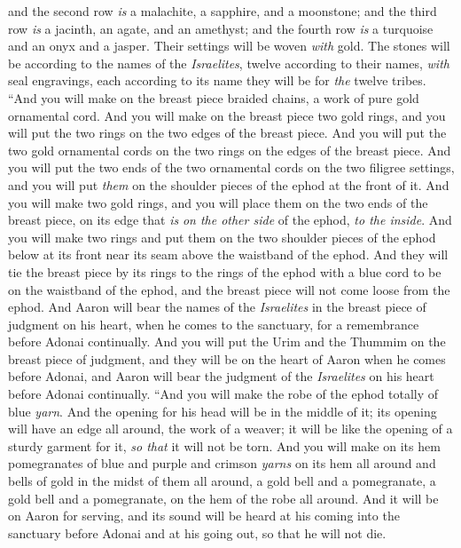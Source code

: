 \begin{biblechapter}
\verse and the second row \textit{is} a malachite, a sapphire, and a moonstone;
\verse and the third row \textit{is} a jacinth, an agate, and an amethyst;
\verse and the fourth row \textit{is} a turquoise and an onyx and a jasper. Their settings will be woven \textit{with} gold.
\verse The stones will be according to the names of the \textit{Israelites}, twelve according to their names, \textit{with} seal engravings, each according to its name they will be for \textit{the} twelve tribes.
\verse “And you will make on the breast piece braided chains, a work of pure gold ornamental cord.
\verse And you will make on the breast piece two gold rings, and you will put the two rings on the two edges of the breast piece.
\verse And you will put the two gold ornamental cords on the two rings on the edges of the breast piece.
\verse And you will put the two ends of the two ornamental cords on the two filigree settings, and you will put \textit{them} on the shoulder pieces of the ephod at the front of it.
\verse And you will make two gold rings, and you will place them on the two ends of the breast piece, on its edge that \textit{is} \textit{on the other side} of the ephod, \textit{to the inside}.
\verse And you will make two rings and put them on the two shoulder pieces of the ephod below at its front near its seam above the waistband of the ephod.
\verse And they will tie the breast piece by its rings to the rings of the ephod with a blue cord to be on the waistband of the ephod, and the breast piece will not come loose from the ephod.
\verse And Aaron will bear the names of the \textit{Israelites} in the breast piece of judgment on his heart, when he comes to the sanctuary, for a remembrance before Adonai continually.
\verse And you will put the Urim and the Thummim on the breast piece of judgment, and they will be on the heart of Aaron when he comes before Adonai, and Aaron will bear the judgment of the \textit{Israelites} on his heart before Adonai continually.
\verse “And you will make the robe of the ephod totally of blue \textit{yarn}.
\verse And the opening for his head will be in the middle of it; its opening will have an edge all around, the work of a weaver; it will be like the opening of a sturdy garment for it, \textit{so that} it will not be torn.
\verse And you will make on its hem pomegranates of blue and purple and crimson \textit{yarns} on its hem all around and bells of gold in the midst of them all around,
\verse a gold bell and a pomegranate, a gold bell and a pomegranate, on the hem of the robe all around.
\verse And it will be on Aaron for serving, and its sound will be heard at his coming into the sanctuary before Adonai and at his going out, so that he will not die.

\end{biblechapter}

